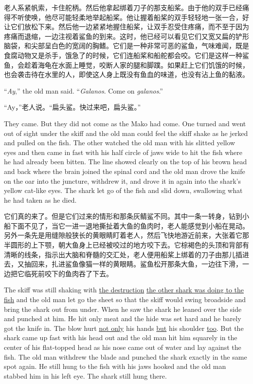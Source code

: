 \begin{paracol}{2}
\switchcolumn

老人系紧帆索，卡住舵柄。然后他拿起绑着刀子的那支船桨。由于他的双手已经痛得不听使唤，他尽可能轻柔地举起船桨。他让握着船桨的双手轻轻地一张一合，好让它们放松下来。然后他一边紧紧地握住船桨，让双手忍受住疼痛，而不至于因为疼痛而退缩，一边注视着鲨鱼的到来。这时，他已经可以看见它们又宽又扁的铲形脑袋，和尖部呈白色的宽阔的胸鳍。它们是一种非常可恶的鲨鱼，气味难闻，既是食腐动物又是杀手，饿急了的时候，它们连船桨和船舵都会咬。它们是这样一种鲨鱼，会趁着海龟在水面上睡觉，咬断人家的腿和脚蹼。如果赶上它们饥饿的时候，也会袭击待在水里的人，即使这人身上既没有鱼血的味道，也没有沾上鱼的黏液。

\switchcolumn*

``\emph{Ay},'' the old man said. ``\emph{Galanos}. Come on \emph{galanos}.''

\switchcolumn

“Ay，”老人说。“扁头鲨。快过来吧，扁头鲨。”

\switchcolumn*

They came. But they did not come as the Mako had come. One turned and went
out of sight under the skiff and the old man could feel the skiff \gls{shake} as
he jerked and pulled on the fish. The other watched the old man with his
\gls{slitted} yellow eyes and then came in fast with his half circle of jaws
wide to hit the fish where he had already been \gls{bitten}. The line showed
clearly on the top of his brown head and back where the brain joined the
\gls{spinal} cord and the old man drove the knife on the oar into the
\gls{juncture}, \gls{withdrew} it, and drove it in again into the shark's yellow
cat-like eyes. The shark let go of the fish and slid down, swallowing what
he had taken as he died.

\switchcolumn

它们真的来了。但是它们过来的情形和那条灰鲭鲨不同。其中一条一转身，钻到小船下面不见了，当它一进一退地撕扯着大鱼的鱼肉时，老人能感觉到小船在晃动。另外一条先是用缝隙般狭长的黄眼睛盯着老人，然后飞快地游近前来，大张着它那半圆形的上下颚，朝大鱼身上已经被咬过的地方咬下去。它棕褐色的头顶和背部有清晰的线条，指示出大脑和脊髓的交汇处，老人便用船桨上绑着的刀子由那儿插进去，又抽回来，扎进鲨鱼像猫一样的黄眼睛。鲨鱼松开那条大鱼，一边往下滑，一边把它临死前咬下的鱼肉吞了下去。

\switchcolumn*

The skiff was still shaking with \uline{the destruction} \uline{the other
  shark was doing to the fish} and the old man let go the sheet so that the
skiff would \gls{swing} \gls{broadside} and bring the shark out from under.
When he saw the shark he leaned over the side and \gls{punched} at him. He
hit only meat and the hide was set hard and he \gls{barely} got the knife
in. The blow hurt \uline{not only} his hands \uline{but} his shoulder
\uline{too}. But the shark came up fast with his head out and the old man
hit him \gls{squarely} in the center of his flat-topped head as his nose
came out of water and lay against the fish. The old man withdrew the blade
and punched the shark exactly in the same spot again. He still hung to the
fish with his jaws hooked and the old man \gls{stabbed} him in his left eye.
The shark still hung there.


\end{paracol}
